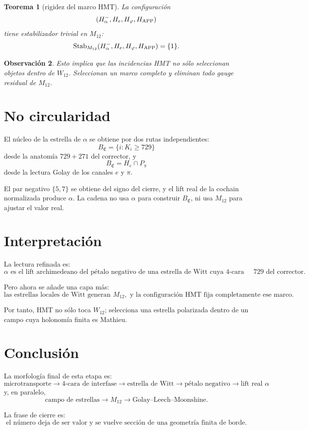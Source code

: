 \documentclass[11pt,a4paper]{article}
\newtheorem{teorema}{Teorema}
\newtheorem{observacion}[teorema]{Observación}
\newcommand{\BC}{B_{\mathfrak C}}
\newcommand{\Halpha}{H_\alpha^-}
\newcommand{\He}{H_e}
\newcommand{\Hphi}{H_\varphi}
\newcommand{\Happ}{H_{\rm APP}}
\newcommand{\Ppi}{P_\pi}
\begin{document}
\begin{teorema}[rigidez del marco HMT]
La configuración
\[
(\Halpha,\He,\Hphi,\Happ)
\]
tiene estabilizador trivial en \(M_{12}\):
\[
\operatorname{Stab}_{M_{12}}(\Halpha,\He,\Hphi,\Happ)=\{1\}.
\]
\end{teorema}

\begin{observacion}
Esto implica que las incidencias HMT no sólo seleccionan objetos dentro de \(W_{12}\). Seleccionan un marco completo y eliminan todo gauge residual de \(M_{12}\).
\end{observacion}

\section{No circularidad}

El núcleo de la estrella de \(\alpha\) se obtiene por dos rutas independientes:
\[
\BC=\{i:K_i\ge729\}
\]
desde la anatomía \(729+271\) del corrector, y
\[
\BC=\He\cap\Ppi
\]
desde la lectura Golay de los canales \(e\) y \(\pi\).

El par negativo \(\{5,7\}\) se obtiene del signo del cierre, y el lift real de la cochain normalizada produce \(\alpha\). La cadena no usa \(\alpha\) para construir \(B_{\mathfrak C}\), ni usa \(M_{12}\) para ajustar el valor real.

\section{Interpretación}

La lectura refinada es:
\[
\boxed{
\alpha \text{ es el lift archimedeano del pétalo negativo de una estrella de Witt cuya 4-cara nuclear es la corona }729\text{ del corrector.}
}
\]

Pero ahora se añade una capa más:
\[
\boxed{
\text{las estrellas locales de Witt generan }M_{12},
\text{ y la configuración HMT fija completamente ese marco.}
}
\]

Por tanto, HMT no sólo toca \(W_{12}\); selecciona una estrella polarizada dentro de un campo cuya holonomía finita es Mathieu.

\section{Conclusión}

La morfología final de esta etapa es:
\[
\text{microtransporte}
\longrightarrow
\text{4-cara de interfase}
\longrightarrow
\text{estrella de Witt}
\longrightarrow
\text{pétalo negativo}
\longrightarrow
\text{lift real } \alpha
\]
y, en paralelo,
\[
\text{campo de estrellas}
\longrightarrow
M_{12}
\longrightarrow
\text{Golay--Leech--Moonshine}.
\]

La frase de cierre es:
\[
\boxed{
\text{el número deja de ser valor y se vuelve sección de una geometría finita de borde.}
}
\]
\end{document}
